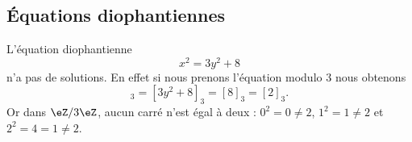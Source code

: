 \subsection{Équations diophantiennes}

\begin{example} \label{ExZPVFooPpdKJc}
    L'équation diophantienne
    \begin{equation}
        x^2=3y^2+8
    \end{equation}
    n'a pas de solutions. En effet si nous prenons l'équation modulo \( 3\) nous obtenons
    \begin{equation}
        [x^2]_3=[3y^2+8]_3=[8]_3=[2]_3.
    \end{equation}
    Or dans \( \eZ/3\eZ\), aucun carré n'est égal à deux : \( 0^2=0\neq 2\), \( 1^2=1\neq 2\) et \( 2^2=4=1\neq 2\).
\end{example}

